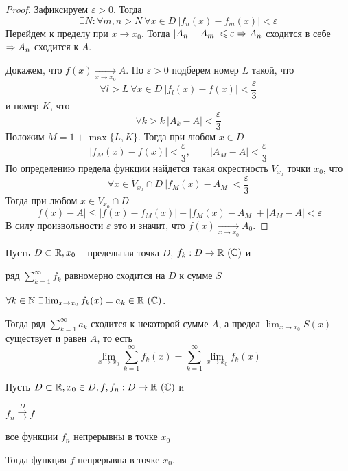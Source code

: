 \begin{proof}
	Зафиксируем $\varepsilon > 0$. Тогда
	\[\exists N : \forall m, n > N \ \forall x \in D \ |f_n(x) - f_m(x)| < \varepsilon\]
	Перейдем к пределу при $x \to x_0$. Тогда $|A_n - A_m| \leqslant \varepsilon \Rightarrow A_n$ сходится в себе $\Rightarrow A_n$ сходится к $A$.

	Докажем, что $f(x) \xrightarrow[x \to x_0]{} A$. По $\varepsilon > 0$ подберем номер $L$ такой, что
	\[\forall l > L \ \forall x \in D \ |f_l(x) - f(x)| < \frac{\varepsilon}{3}\]
	и номер $K$, что
	\[\forall k > k \ |A_k - A| < \frac{\varepsilon}{3}\]
	Положим $M = 1 + \max \{L, K\}$. Тогда при любом $x \in D$ 
	\[|f_M(x) - f(x)| < \frac{\varepsilon}{3}, \qquad |A_M - A| < \frac{\varepsilon}{3}\]
	По определению предела функции найдется такая окрестность $V_{x_0}$ точки $x_0$, что 
	\[\forall x \in \dot{V}_{x_0} \cap D \ |f_M(x) - A_M| < \frac{\varepsilon}{3}\]
	Тогда при любом $x \in \dot{V}_{x_0} \cap D$
	\[|f(x) - A| \leqslant |f(x) - f_M(x)| + |f_M(x) - A_M| + |A_M - A| < \varepsilon\]
	В силу произвольности $\varepsilon$ это и значит, что $f(x) \xrightarrow[x \to x_0]{} A_0$.  
\end{proof}

\begin{Thm}
	Пусть $D \subset \mathbb{R}, x_0$ -- предельная точка $D$, $f_k : D \to \mathbb{R} \ (\mathbb{C})$ и
	\begin{MyList}
		\item ряд $\sum_{k=1}^{\infty} f_k$ равномерно сходится на $D$ к сумме $S$
		\item $\forall k \in \mathbb{N} \ \exists \lim_{x \to x_0} f_k(x) = a_k \in \mathbb{R} \ (\mathbb{C})$.  
	\end{MyList}
	Тогда ряд $\sum_{k=1}^{\infty} a_k$ сходится к некоторой сумме $A$, а предел $\lim_{x \to x_0} S(x)$ существует и равен $A$, то есть
	\[\lim_{x \to x_0} \sum_{k=1}^{\infty} f_k(x) = \sum_{k=1}^{\infty} \lim_{x \to x_0} f_k(x)\]  
\end{Thm}

\begin{Cons}
	Пусть $D \subset \mathbb{R}, x_0 \in D, f, f_n : D \to \mathbb{R} \ (\mathbb{C})$ и
	\begin{MyList}
		\item $f_n \overset{D}{\rightrightarrows} f$  
		\item все функции $f_n$ непрерывны в точке $x_0$ 
	\end{MyList} 
	Тогда функция $f$ непрерывна в точке $x_0$.
\end{Cons}

